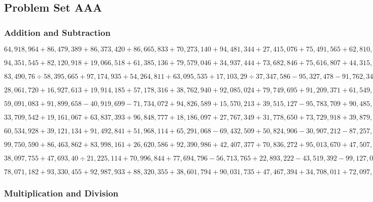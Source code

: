 \hypertarget{problem-set-aaa-17}{%
\subsection{Problem Set AAA}\label{problem-set-aaa-17}}

\hypertarget{addition-and-subtraction-373}{%
\subsubsection{Addition and
Subtraction}\label{addition-and-subtraction-373}}

\(64,918,964+86,479,389+86,373,420+86,665,833+70,273,140+94,481,344+27,415,076+75,491,565+62,810,506+63,651,331\)

\(94,351,545+82,120,918+19,066,518+61,385,136+79,579,046+34,937,444+73,682,846+75,616,807+44,315,983+94,714,982\)

\(83,490,76÷58,395,665+97,174,935+54,264,811+63,095,535+17,103,29÷37,347,586-95,327,478-91,762,340+72,704,286\)

\(28,061,720+16,927,613+19,914,185+57,178,316+38,762,940+92,085,024+79,749,695+91,209,371+61,549,764+33,468,697\)

\(59,091,083+91,899,658-40,919,699-71,734,072+94,826,589+15,570,213+39,515,127-95,783,709+90,485,22÷71,702,855\)

\(33,709,542+19,161,067+63,837,393+96,848,777+18,186,097+27,767,349+31,778,650+73,729,918+39,879,565+54,905,197\)

\(60,534,928+39,121,134+91,492,841+51,968,114+65,291,068-69,432,509+50,824,906-30,907,212-87,257,068-23,785,840\)

\(99,750,590+86,463,862+83,998,161+26,620,586+92,390,986+42,407,377+70,836,272+95,013,670+47,507,612+87,632,123\)

\(38,097,755+47,693,40÷21,225,114+70,996,844+77,694,796-56,713,765+22,893,222-43,519,392-99,127,053+43,562,978\)

\(78,071,182+93,330,455+92,987,933+88,320,355+38,601,794+90,031,735+47,467,394+34,708,011+72,097,423+94,518,714\)

\hypertarget{multiplication-and-division-372}{%
\subsubsection{Multiplication and
Division}\label{multiplication-and-division-372}}

